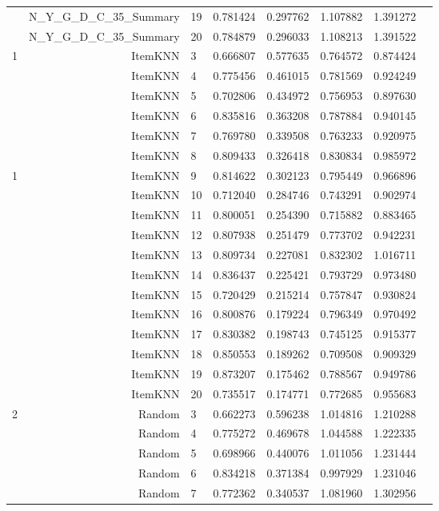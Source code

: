 \documentclass[a4paper,12pt]{article}
\begin{document}
\begin{center}
\begin{longtable}{lrlrrrrr}
& N\_Y\_G\_D\_C\_35\_Summary & 19 & 0.781424 & 0.297762 & 1.107882 & 1.391272 \\
& N\_Y\_G\_D\_C\_35\_Summary & 20 & 0.784879 & 0.296033 & 1.108213 & 1.391522 \\ \hline
\multirow{6}{1cm}{1} & ItemKNN & 3 & 0.666807 & 0.577635 & 0.764572 & 0.874424 \\
& ItemKNN & 4 & 0.775456 & 0.461015 & 0.781569 & 0.924249 \\
& ItemKNN & 5 & 0.702806 & 0.434972 & 0.756953 & 0.897630 \\
& ItemKNN & 6 & 0.835816 & 0.363208 & 0.787884 & 0.940145 \\
& ItemKNN & 7 & 0.769780 & 0.339508 & 0.763233 & 0.920975 \\
& ItemKNN & 8 & 0.809433 & 0.326418 & 0.830834 & 0.985972 \\
\multirow{12}{1cm}{1} & ItemKNN & 9 & 0.814622 & 0.302123 & 0.795449 & 0.966896 \\
& ItemKNN & 10 & 0.712040 & 0.284746 & 0.743291 & 0.902974 \\
& ItemKNN & 11 & 0.800051 & 0.254390 & 0.715882 & 0.883465 \\
& ItemKNN & 12 & 0.807938 & 0.251479 & 0.773702 & 0.942231 \\
& ItemKNN & 13 & 0.809734 & 0.227081 & 0.832302 & 1.016711 \\
& ItemKNN & 14 & 0.836437 & 0.225421 & 0.793729 & 0.973480 \\
& ItemKNN & 15 & 0.720429 & 0.215214 & 0.757847 & 0.930824 \\
& ItemKNN & 16 & 0.800876 & 0.179224 & 0.796349 & 0.970492 \\
& ItemKNN & 17 & 0.830382 & 0.198743 & 0.745125 & 0.915377 \\
& ItemKNN & 18 & 0.850553 & 0.189262 & 0.709508 & 0.909329 \\
& ItemKNN & 19 & 0.873207 & 0.175462 & 0.788567 & 0.949786 \\
& ItemKNN & 20 & 0.735517 & 0.174771 & 0.772685 & 0.955683 \\ \hline
\multirow{18}{1cm}{2} & Random & 3 & 0.662273 & 0.596238 & 1.014816 & 1.210288 \\
& Random & 4 & 0.775272 & 0.469678 & 1.044588 & 1.222335 \\
& Random & 5 & 0.698966 & 0.440076 & 1.011056 & 1.231444 \\
& Random & 6 & 0.834218 & 0.371384 & 0.997929 & 1.231046 \\
& Random & 7 & 0.772362 & 0.340537 & 1.081960 & 1.302956 \\

\end{longtable}
\end{center}
\end{document}
